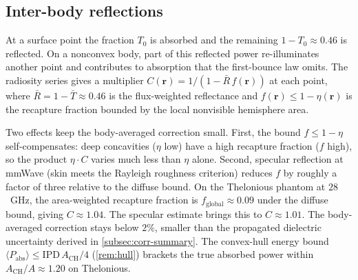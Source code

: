 \documentclass[journal,twocolumn,10pt]{IEEEtran}
\theoremstyle{plain}
\theoremstyle{remark}
\newcommand{\rr}{\mathbf{r}}
\newcommand{\IPD}{\mathrm{IPD}}
\newcommand{\Tbar}{\bar{T}}
\begin{document}
\subsection{Inter-body reflections}\label{subsec:corr-interbody}
At a surface point the fraction $T_0$ is absorbed and the remaining
$1 - T_0 \approx 0.46$ is reflected. On a nonconvex body, part of
this reflected power re-illuminates another point and contributes
to absorption that the first-bounce law omits. The radiosity series
gives a multiplier $C(\rr) = 1/(1 - \bar{R}\,f(\rr))$ at each point,
where $\bar{R} = 1 - \Tbar \approx 0.46$ is the flux-weighted
reflectance and $f(\rr) \le 1 - \eta(\rr)$ is the recapture fraction
bounded by the local nonvisible hemisphere area.

Two effects keep the body-averaged correction small. First, the bound
$f \le 1 - \eta$ self-compensates: deep concavities ($\eta$ low) have
a high recapture fraction ($f$ high), so the product $\eta\cdot C$
varies much less than $\eta$ alone. Second, specular reflection at
mmWave (skin meets the Rayleigh roughness criterion) reduces $f$ by
roughly a factor of three relative to the diffuse bound. On the
Thelonious phantom at $28$~GHz, the area-weighted recapture fraction is
$f_{\mathrm{global}} \approx 0.09$ under the diffuse bound, giving
$C \approx 1.04$. The specular estimate brings this to
$C \approx 1.01$. The body-averaged correction stays below $2\%$,
smaller than the propagated dielectric uncertainty derived in
\cref{subsec:corr-summary}. The convex-hull energy bound
$\langle P_{\mathrm{abs}}\rangle \le \IPD\,A_{\mathrm{CH}}/4$
(\cref{rem:hull}) brackets the true absorbed power within
$A_{\mathrm{CH}}/A \approx 1.20$ on Thelonious.
\end{document}
